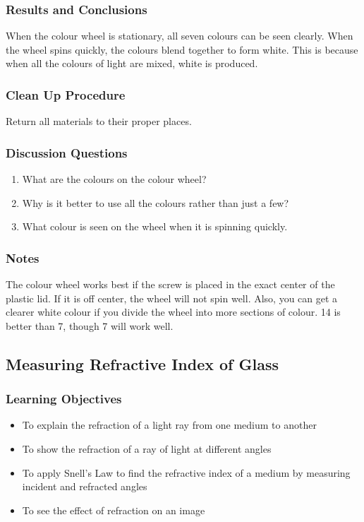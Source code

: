\subsubsection*{Results and Conclusions}
When the colour wheel is stationary, all seven colours can be seen clearly. When the wheel spins quickly, the colours blend together to form white. This is because when all the colours of light are mixed, white is produced.  

\subsubsection*{Clean Up Procedure}
Return all materials to their proper places.

\subsubsection*{Discussion Questions}
\begin{enumerate}
\item{What are the colours on the colour wheel?}
\item{Why is it better to use all the colours rather than just a few?}
\item{What colour is seen on the wheel when it is spinning quickly.} 
\end{enumerate}

\subsubsection*{Notes}
The colour wheel works best if the screw is placed in the exact center of the plastic lid. If it is off center, the wheel will not spin well. Also, you can get a clearer white colour if you divide the wheel into more sections of colour. 14 is better than 7, though 7 will work well.  



\subsection{Measuring Refractive Index of Glass}

\subsubsection*{Learning Objectives}
\begin{itemize}
\item{To explain the refraction of a light ray from one medium to another} 
\item{To show the refraction of a ray of light at different angles} 
\item{To apply Snell's Law to find the refractive index of a medium by measuring incident and refracted angles} 
\item{To see the effect of refraction on an image} 
\end{itemize}

